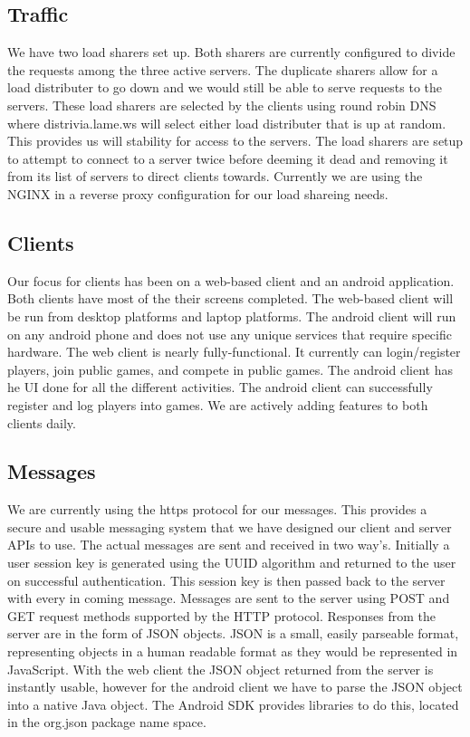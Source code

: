 \documentclass{dependencies/acm_proc_article-sp}
\begin{document}
\subsection {Traffic}
We have two load sharers set up. Both sharers are currently configured to
divide the requests among the three active servers. The duplicate sharers allow
for a load distributer to go down and we would still be able to serve requests
to the servers. These load sharers are selected by the clients using round
robin DNS where distrivia.lame.ws will select either load distributer that is
up at random. This provides us will stability for access to the servers. The
load sharers are setup to attempt to connect to a server twice before
deeming it dead and removing it from its list of servers to direct clients towards.
Currently we are using the NGINX \cite{nginx} in a reverse proxy configuration
for our load shareing needs.

\subsection {Clients}
Our focus for clients has been on a web-based client and an android application.
Both clients have most of the their screens completed. The web-based client will
be run from desktop platforms and laptop platforms. The android client will run
on any android phone and does not use any unique services that require specific
hardware. The web client is nearly fully-functional. It currently can login/register
players, join public games, and compete in public games. The android client has
he UI done for all the different activities. The android client can successfully register
and log players into games. We are actively adding features to both clients daily.

\subsection {Messages}
We are currently using the https protocol for our messages. This provides a secure
and usable messaging system that we have designed our client and server APIs to use.
The actual messages are sent and received in two way's. Initially a user session key is
generated using the UUID \cite{uuid} algorithm and returned to the user on successful
authentication. This session key is then passed back to the server with every in coming
message. Messages are sent to the server using POST and GET request methods supported
by the HTTP protocol. Responses from the server are in the form of JSON \cite{json} objects.
JSON is a small, easily parseable format, representing objects in a human readable format as
they would be represented in JavaScript. With the web client the JSON object returned from
the server is instantly usable, however for the android client we have to parse the JSON object
into a native Java object. The Android SDK provides libraries to do this, located in the
org.json \cite{orgjson} package name space.
\end{document}
